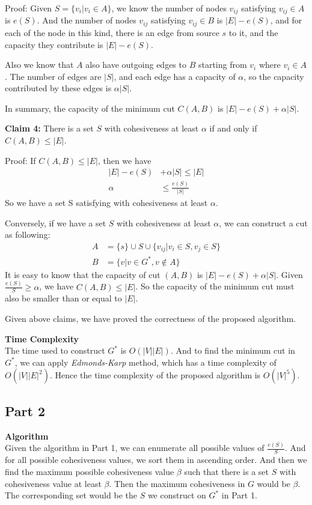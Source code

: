\documentclass{article}
\newcommand{\Complexity}{\vspace{0.3cm} \noindent\textbf{Time Complexity} \\}
\newcommand{\Algorithm}{\textbf{Algorithm} \\}
\begin{document}
Proof: Given $S = \{v_i | v_i \in A \}$, we know the number of nodes $v_{ij}$ satisfying $v_{ij} \in A$ is
$e(S)$. And the number of nodes $v_{ij}$ satisfying  $v_{ij}\in B$ is $|E| - e(S)$, and for each
of the node in this kind, there is an edge from source $s$ to it, and the capacity they contribute
is $|E| - e(S)$. 

Also we know that $A$ also have outgoing edges to $B$ starting from $v_i$ where $v_i \in A$. 
The number of edges are $|S|$, and each edge has a capacity of $\alpha$, so
the capacity contributed by these edges is $\alpha|S|$. 

In summary, the capacity of the minimum cut $C(A, B)$ is $|E| - e(S) + \alpha |S|$.

\textbf{Claim 4:} 
There is a set $S$ with cohesiveness at least $\alpha$ if and only if $C(A, B) \leq |E|$.

Proof: If $C(A, B) \leq |E|$, then we have
\begin{align}
    |E| - e(S) & + \alpha |S|  \leq |E| \\
    \alpha & \leq \frac{e(S)}{|S|} 
\end{align}
So we have a set S satisfying with cohesiveness at least $\alpha$.

Conversely, if we have a set $S$ with cohesiveness at least $\alpha$, we can construct a cut as
following:
\begin{align}
  A & = \{s\} \cup S \cup \{v_{ij}  | v_i \in S, v_j \in S \} \\
  B & = \{v | v \in G^*, v \notin A\}
\end{align}
It is easy to know that the capacity of cut $(A, B)$ is $|E| - e(S) + \alpha |S|$. Given
$\frac{e(S)}{S} \geq \alpha$, we have $C(A, B) \leq |E|$. So the capacity of the minimum cut must
also be smaller than or equal to $|E|$.

Given above claims, we have proved the correctness of the proposed algorithm.

\Complexity
The time used to construct $G^*$ is $O(|V||E|)$. And to find the minimum cut in $G^*$, we can
apply \textit{Edmonds-Karp} method, which has a time complexity of $O(|V||E|^2)$. Hence the time
complexity of the proposed algorithm is $O(|V|^5)$.

\subsection*{Part 2}
\Algorithm
Given the algorithm in Part 1, we can enumerate all possible values of $\frac{e(S)}{S}$. And for
all possible cohesiveness values, we sort them in ascending order. And then we find the maximum
possible cohesiveness value $\beta$ such that there is a set $S$ with cohesiveness value at least 
$\beta$. Then the maximum cohesiveness in $G$ would be $\beta$. The corresponding set would be the
$S$ we construct on $G^*$ in Part 1.   
\end{document}
